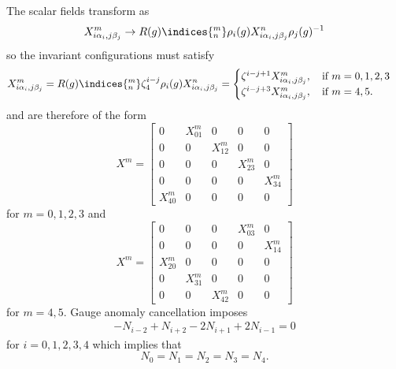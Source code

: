 \documentclass{worksheetclass}
\begin{document}
            The scalar fields transform as
            \begin{equation}
                X^m_{i\alpha_i,j\beta_j}\to R(g)\indices{^m_n}\rho_i(g)X^n_{i\alpha_i,j\beta_j}\rho_j(g)^{-1}
            \end{equation}
            so the invariant configurations must satisfy
            \begin{equation}
                X^m_{i\alpha_i,j\beta_j} = R(g)\indices{^m_n}\zeta^{i-j}_4\rho_i(g)X^n_{i\alpha_i,j\beta_j} = 
                \begin{cases}
                    \zeta^{i-j+1}X^m_{i\alpha_i,j\beta_j},\quad\text{if } m=0,1,2,3\\
                    \zeta^{i-j+3}X^m_{i\alpha_i,j\beta_j},\quad\text{if } m=4,5.
                \end{cases}
            \end{equation}
            and are therefore of the form
            \begin{equation}
                X^m = 
                \begin{bmatrix}
                    0 & X^m_{01} & 0 & 0 & 0\\
                    0 & 0 & X^m_{12} & 0 & 0\\
                    0 & 0 & 0 & X^m_{23} & 0\\
                    0 & 0 & 0 & 0 & X^m_{34}\\
                    X^m_{40} & 0 & 0 & 0 & 0
                \end{bmatrix}
            \end{equation}
            for $m=0,1,2,3$ and 
            \begin{equation}
                X^m = 
                \begin{bmatrix}
                    0 & 0 & 0 & X^m_{03} & 0\\
                    0 & 0 & 0 & 0 & X^m_{14}\\
                    X^m_{20} & 0 & 0 & 0 & 0\\
                    0 & X^m_{31} & 0 & 0 & 0\\
                    0 & 0 & X^m_{42} & 0 & 0
                \end{bmatrix}
            \end{equation}
            for $m=4,5$. Gauge anomaly cancellation imposes
            \begin{align}
                -N_{i-2}+N_{i+2}-2N_{i+1}+2N_{i-1}=0
            \end{align}
            for $i=0,1,2,3,4$ which implies that
            \begin{equation}
                N_0=N_1=N_2=N_3=N_4.
            \end{equation}
\end{document}
